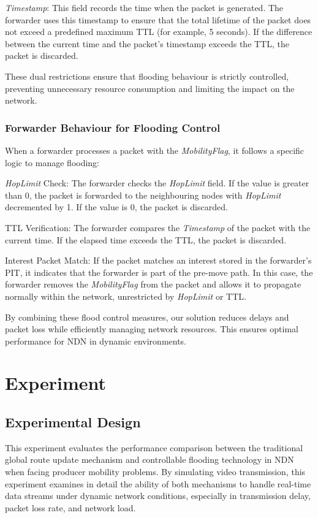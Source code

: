 \documentclass[conference]{IEEEtran}
\begin{document}
\textit{Timestamp}: This field records the time when the packet is generated. The forwarder uses this timestamp to ensure that the total lifetime of the packet does not exceed a predefined maximum TTL (for example, 5 seconds). If the difference between the current time and the packet's timestamp exceeds the TTL, the packet is discarded.

These dual restrictions ensure that flooding behaviour is strictly controlled, preventing unnecessary resource consumption and limiting the impact on the network.

\subsubsection{Forwarder Behaviour for Flooding Control}
When a forwarder processes a packet with the \textit{MobilityFlag}, it follows a specific logic to manage flooding:

\textit{HopLimit} Check: The forwarder checks the \textit{HopLimit} field. If the value is greater than 0, the packet is forwarded to the neighbouring nodes with \textit{HopLimit} decremented by 1. If the value is 0, the packet is discarded.

TTL Verification: The forwarder compares the \textit{Timestamp} of the packet with the current time. If the elapsed time exceeds the TTL, the packet is discarded.

Interest Packet Match: If the packet matches an interest stored in the forwarder’s PIT, it indicates that the forwarder is part of the pre-move path. In this case, the forwarder removes the \textit{MobilityFlag} from the packet and allows it to propagate normally within the network, unrestricted by \textit{HopLimit} or TTL.

By combining these flood control measures, our solution reduces delays and packet loss while efficiently managing network resources. This ensures optimal performance for NDN in dynamic environments.

\section{Experiment}
\subsection{Experimental Design}
This experiment evaluates the performance comparison between the traditional global route update mechanism and controllable flooding technology in NDN when facing producer mobility problems. By simulating video transmission, this experiment examines in detail the ability of both mechanisms to handle real-time data streams under dynamic network conditions, especially in transmission delay, packet loss rate, and network load.
\end{document}
